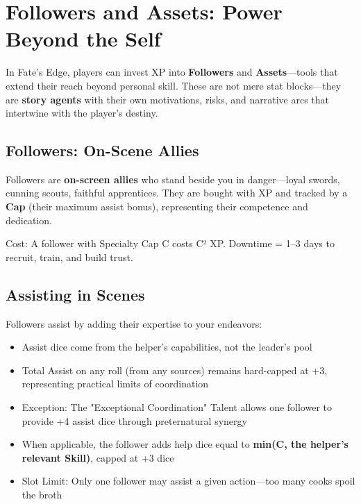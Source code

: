 \section*{Followers and Assets: Power Beyond the Self}

In Fate's Edge, players can invest XP into \textbf{Followers} and \textbf{Assets}---tools that extend their reach beyond personal skill. These are not mere stat blocks---they are \textbf{story agents} with their own motivations, risks, and narrative arcs that intertwine with the player's destiny.

\subsection*{Followers: On-Scene Allies}

Followers are \textbf{on-screen allies} who stand beside you in danger—loyal swords, cunning scouts, faithful apprentices. They are bought with XP and tracked by a \textbf{Cap} (their maximum assist bonus), representing their competence and dedication.

Cost: A follower with Specialty Cap C costs C² XP. Downtime = 1--3 days to recruit, train, and build trust.

\subsection*{Assisting in Scenes}

Followers assist by adding their expertise to your endeavors:

\begin{itemize}
    \item Assist dice come from the helper's capabilities, not the leader's pool
    \item Total Assist on any roll (from any sources) remains hard-capped at +3, representing practical limits of coordination
    \item Exception: The "Exceptional Coordination" Talent allows one follower to provide +4 assist dice through preternatural synergy
    \item When applicable, the follower adds help dice equal to \textbf{min(C, the helper's relevant Skill)}, capped at +3 dice
    \item Slot Limit: Only one follower may assist a given action—too many cooks spoil the broth
\end{itemize}

